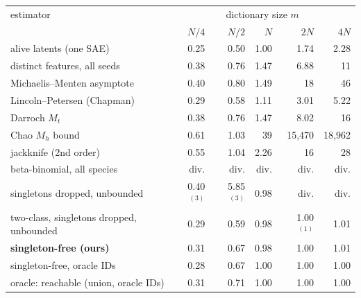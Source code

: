 \begin{tabular}{lrrrrr}
\toprule
estimator & \multicolumn{5}{c}{dictionary size $m$} \\
 & $N/4$ & $N/2$ & $N$ & $2N$ & $4N$ \\
\midrule
alive latents (one SAE) & 0.25 & 0.50 & 1.00 & 1.74 & 2.28 \\
distinct features, all seeds & 0.38 & 0.76 & 1.47 & 6.88 & 11 \\
Michaelis--Menten asymptote & 0.40 & 0.80 & 1.49 & 18 & 46 \\
Lincoln--Petersen (Chapman) & 0.29 & 0.58 & 1.11 & 3.01 & 5.22 \\
Darroch $M_t$ & 0.38 & 0.76 & 1.47 & 8.02 & 16 \\
Chao $M_h$ bound & 0.61 & 1.03 & 39 & 15{,}470 & 18{,}962 \\
jackknife (2nd order) & 0.55 & 1.04 & 2.26 & 16 & 28 \\
beta-binomial, all species & div. & div. & div. & div. & div. \\
\quad singletons dropped, unbounded & 0.40$^{(3)}$ & 5.85$^{(3)}$ & 0.98 & div. & div. \\
two-class, singletons dropped, unbounded & 0.29 & 0.59 & 0.98 & 1.00$^{(1)}$ & 1.01 \\
\textbf{singleton-free (ours)} & 0.31 & 0.67 & 0.98 & 1.00 & 1.01 \\
singleton-free, oracle IDs & 0.28 & 0.67 & 1.00 & 1.00 & 1.00 \\
oracle: reachable (union, oracle IDs) & 0.31 & 0.71 & 1.00 & 1.00 & 1.00 \\
\bottomrule
\end{tabular}
